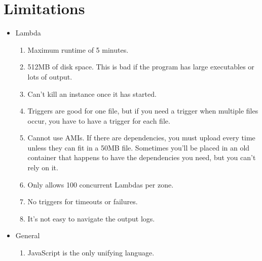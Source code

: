 \vspace{-0.15in}
\section{Limitations}
\begin{itemize}
\item Lambda
\begin{enumerate}
\item Maximum runtime of 5 minutes.
\item 512MB of disk space. This is bad if the program has large executables or lots of output.
\item Can't kill an instance once it has started.
\item Triggers are good for one file, but if you need a trigger when multiple files occur, you have to have a trigger for each file.
\item Cannot use AMIs. If there are dependencies, you must upload every time unless they can fit in a 50MB file. Sometimes you'll be placed in an old container that happens to have the dependencies you need, but you can't rely on it.
\item Only allows 100 concurrent Lambdas per zone.
\item No triggers for timeouts or failures.
\item It's not easy to navigate the output logs.
\end{enumerate}
\item General
\begin{enumerate}
\item JavaScript is the only unifying language.
\end{enumerate}
\end{itemize}

